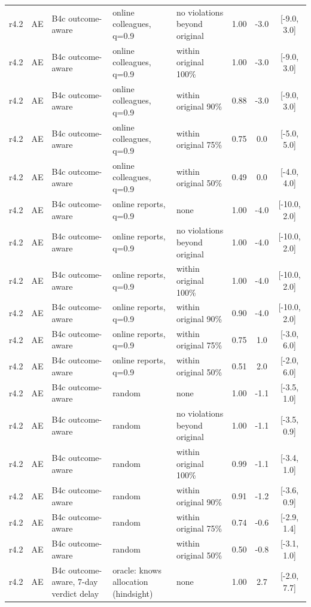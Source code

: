 \documentclass[10pt,onecolumn,letterpaper]{article}
\begin{document}
\begin{longtable}{lllp{4.2cm}p{3.4cm}ccc}
r4.2 & AE & B4c outcome-aware & online colleagues, q=0.9 & no violations beyond original & 1.00 & -3.0 & [-9.0, 3.0] \\
r4.2 & AE & B4c outcome-aware & online colleagues, q=0.9 & within original 100\% & 1.00 & -3.0 & [-9.0, 3.0] \\
r4.2 & AE & B4c outcome-aware & online colleagues, q=0.9 & within original 90\% & 0.88 & -3.0 & [-9.0, 3.0] \\
r4.2 & AE & B4c outcome-aware & online colleagues, q=0.9 & within original 75\% & 0.75 & 0.0 & [-5.0, 5.0] \\
r4.2 & AE & B4c outcome-aware & online colleagues, q=0.9 & within original 50\% & 0.49 & 0.0 & [-4.0, 4.0] \\
r4.2 & AE & B4c outcome-aware & online reports, q=0.9 & none & 1.00 & -4.0 & [-10.0, 2.0] \\
r4.2 & AE & B4c outcome-aware & online reports, q=0.9 & no violations beyond original & 1.00 & -4.0 & [-10.0, 2.0] \\
r4.2 & AE & B4c outcome-aware & online reports, q=0.9 & within original 100\% & 1.00 & -4.0 & [-10.0, 2.0] \\
r4.2 & AE & B4c outcome-aware & online reports, q=0.9 & within original 90\% & 0.90 & -4.0 & [-10.0, 2.0] \\
r4.2 & AE & B4c outcome-aware & online reports, q=0.9 & within original 75\% & 0.75 & 1.0 & [-3.0, 6.0] \\
r4.2 & AE & B4c outcome-aware & online reports, q=0.9 & within original 50\% & 0.51 & 2.0 & [-2.0, 6.0] \\
r4.2 & AE & B4c outcome-aware & random & none & 1.00 & -1.1 & [-3.5, 1.0] \\
r4.2 & AE & B4c outcome-aware & random & no violations beyond original & 1.00 & -1.1 & [-3.5, 0.9] \\
r4.2 & AE & B4c outcome-aware & random & within original 100\% & 0.99 & -1.1 & [-3.4, 1.0] \\
r4.2 & AE & B4c outcome-aware & random & within original 90\% & 0.91 & -1.2 & [-3.6, 0.9] \\
r4.2 & AE & B4c outcome-aware & random & within original 75\% & 0.74 & -0.6 & [-2.9, 1.4] \\
r4.2 & AE & B4c outcome-aware & random & within original 50\% & 0.50 & -0.8 & [-3.1, 1.0] \\
r4.2 & AE & B4c outcome-aware, 7-day verdict delay & oracle: knows allocation (hindsight) & none & 1.00 & 2.7 & [-2.0, 7.7] \\

\end{longtable}
\end{document}
